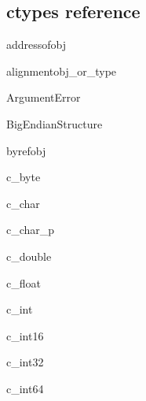\subsection{ctypes reference\label{ctypes-reference}}

\begin{funcdesc}{addressof}{obj}
\end{funcdesc}

\begin{funcdesc}{alignment}{obj_or_type}
\end{funcdesc}

\begin{excclassdesc}{ArgumentError}{}
\end{excclassdesc}

\begin{classdesc}{BigEndianStructure}{}
\end{classdesc}

\begin{funcdesc}{byref}{obj}
\end{funcdesc}

\begin{classdesc}{c_byte}{}
\end{classdesc}

\begin{classdesc}{c_char}{}
\end{classdesc}

\begin{classdesc}{c_char_p}{}
\end{classdesc}

\begin{classdesc}{c_double}{}
\end{classdesc}

\begin{classdesc}{c_float}{}
\end{classdesc}

\begin{classdesc}{c_int}{}
\end{classdesc}

\begin{classdesc}{c_int16}{}
\end{classdesc}

\begin{classdesc}{c_int32}{}
\end{classdesc}

\begin{classdesc}{c_int64}{}
\end{classdesc}

